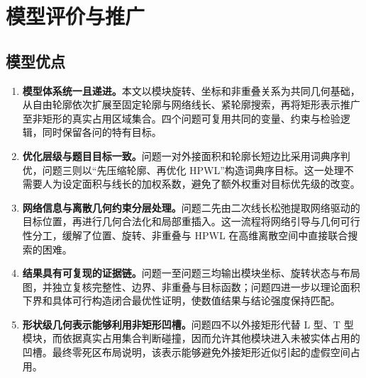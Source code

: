 \section{模型评价与推广}

\subsection{模型优点}
\begin{enumerate}[label=\arabic*.,leftmargin=2.4em,itemsep=0.35em]
  \item \textbf{模型体系统一且递进。}本文以模块旋转、坐标和非重叠关系为共同几何基础，从自由轮廓依次扩展至固定轮廓与网络线长、紧轮廓搜索，再将矩形表示推广至非矩形的真实占用区域集合。四个问题可复用共同的变量、约束与检验逻辑，同时保留各问的特有目标。
  \item \textbf{优化层级与题目目标一致。}问题一对外接面积和轮廓长短边比采用词典序判优，问题三则以“先压缩轮廓、再优化 HPWL”构造词典序目标。这一处理不需要人为设定面积与线长的加权系数，避免了额外权重对目标优先级的改变。
  \item \textbf{网络信息与离散几何约束分层处理。}问题二先由二次线长松弛提取网络驱动的目标位置，再进行几何合法化和局部重插入。这一流程将网络引导与几何可行性分工，缓解了位置、旋转、非重叠与 HPWL 在高维离散空间中直接联合搜索的困难。
  \item \textbf{结果具有可复现的证据链。}问题一至问题三均输出模块坐标、旋转状态与布局图，并独立复核完整性、边界、非重叠与目标函数；问题四进一步以理论面积下界和具体可行构造闭合最优性证明，使数值结果与结论强度保持匹配。
  \item \textbf{形状级几何表示能够利用非矩形凹槽。}问题四不以外接矩形代替 L 型、T 型模块，而依据真实占用集合判断碰撞，因而允许其他模块进入未被实体占用的凹槽。最终零死区布局说明，该表示能够避免外接矩形近似引起的虚假空间占用。
\end{enumerate}

